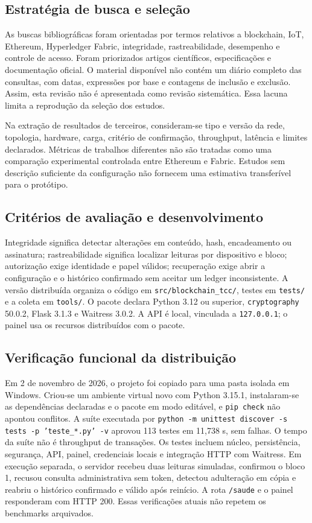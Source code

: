 \documentclass[10pt,a4paper,twocolumn]{article}
\begin{document}
\subsection{Estratégia de busca e seleção}
As buscas bibliográficas foram orientadas por termos relativos a blockchain, IoT, Ethereum, Hyperledger Fabric, integridade, rastreabilidade, desempenho e controle de acesso. Foram priorizados artigos científicos, especificações e documentação oficial. O material disponível não contém um diário completo das consultas, com datas, expressões por base e contagens de inclusão e exclusão. Assim, esta revisão não é apresentada como revisão sistemática. Essa lacuna limita a reprodução da seleção dos estudos.

Na extração de resultados de terceiros, consideram-se tipo e versão da rede, topologia, hardware, carga, critério de confirmação, throughput, latência e limites declarados. Métricas de trabalhos diferentes não são tratadas como uma comparação experimental controlada entre Ethereum e Fabric. Estudos sem descrição suficiente da configuração não fornecem uma estimativa transferível para o protótipo.

\subsection{Critérios de avaliação e desenvolvimento}
Integridade significa detectar alterações em conteúdo, hash, encadeamento ou assinatura; rastreabilidade significa localizar leituras por dispositivo e bloco; autorização exige identidade e papel válidos; recuperação exige abrir a configuração e o histórico confirmado sem aceitar um ledger inconsistente. A versão distribuída organiza o código em \texttt{src/blockchain\_tcc/}, testes em \texttt{tests/} e a coleta em \texttt{tools/}. O pacote declara Python 3.12 ou superior, \texttt{cryptography} 50.0.2, Flask 3.1.3 e Waitress 3.0.2. A API é local, vinculada a \texttt{127.0.0.1}; o painel usa os recursos distribuídos com o pacote.

\subsection{Verificação funcional da distribuição}
Em 2 de novembro de 2026, o projeto foi copiado para uma pasta isolada em Windows. Criou-se um ambiente virtual novo com Python 3.15.1, instalaram-se as dependências declaradas e o pacote em modo editável, e \texttt{pip check} não apontou conflitos. A suíte executada por \texttt{python -m unittest discover -s tests -p 'teste\_*.py' -v} aprovou 113 testes em 11,738 s, sem falhas. O tempo da suíte não é throughput de transações. Os testes incluem núcleo, persistência, segurança, API, painel, credenciais locais e integração HTTP com Waitress. Em execução separada, o servidor recebeu duas leituras simuladas, confirmou o bloco 1, recusou consulta administrativa sem token, detectou adulteração em cópia e reabriu o histórico confirmado e válido após reinício. A rota \texttt{/saude} e o painel responderam com HTTP 200. Essas verificações atuais não repetem os benchmarks arquivados.
\end{document}
